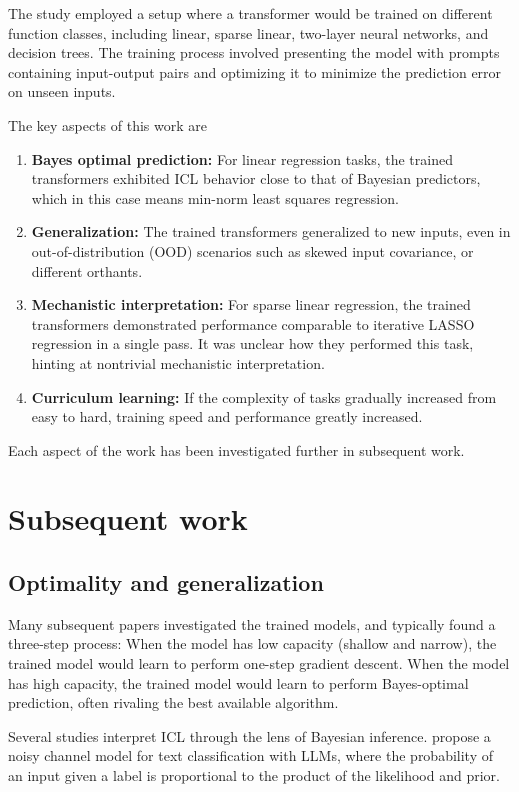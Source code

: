 \documentclass[12pt]{article}
\begin{document}
The study employed a setup where a transformer would be trained on different function classes, including linear, sparse linear, two-layer neural networks, and decision trees. The training process involved presenting the model with prompts containing input-output pairs and optimizing it to minimize the prediction error on unseen inputs.

The key aspects of this work are

\begin{enumerate}
	\item \textbf{Bayes optimal prediction:} For linear regression tasks, the trained transformers exhibited ICL behavior close to that of Bayesian predictors, which in this case means min-norm least squares regression.
	\item \textbf{Generalization:} The trained transformers generalized to new inputs, even in out-of-distribution (OOD) scenarios such as skewed input covariance, or different orthants.
	\item \textbf{Mechanistic interpretation:} For sparse linear regression, the trained transformers demonstrated performance comparable to iterative LASSO regression in a single pass. It was unclear how they performed this task, hinting at nontrivial mechanistic interpretation.
	\item \textbf{Curriculum learning:} If the complexity of tasks gradually increased from easy to hard, training speed and performance greatly increased.
\end{enumerate}

Each aspect of the work has been investigated further in subsequent work.

\section{Subsequent work}

\subsection{Optimality and generalization}

Many subsequent papers investigated the trained models, and typically found a three-step process: When the model has low capacity (shallow and narrow), the trained model would learn to perform one-step gradient descent. When the model has high capacity, the trained model would learn to perform Bayes-optimal prediction, often rivaling the best available algorithm.

Several studies interpret ICL through the lens of Bayesian inference. \cite{minNoisyChannelLanguage2022} propose a noisy channel model for text classification with LLMs, where the probability of an input given a label is proportional to the product of the likelihood and prior.
\end{document}
